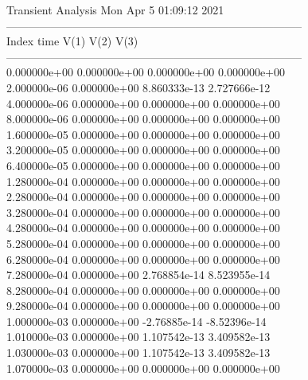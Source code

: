                                    Transient Analysis  Mon Apr  5 01:09:12  2021\\ \hline
--------------------------------------------------------------------------------\\ \hline
Index   time            V(1)            V(2)            V(3)            \\ \hline
--------------------------------------------------------------------------------\\ 	0.000000e+00	0.000000e+00	0.000000e+00	0.000000e+00	\\ 	2.000000e-06	0.000000e+00	8.860333e-13	2.727666e-12	\\ 	4.000000e-06	0.000000e+00	0.000000e+00	0.000000e+00	\\ 	8.000000e-06	0.000000e+00	0.000000e+00	0.000000e+00	\\ 	1.600000e-05	0.000000e+00	0.000000e+00	0.000000e+00	\\ 	3.200000e-05	0.000000e+00	0.000000e+00	0.000000e+00	\\ 	6.400000e-05	0.000000e+00	0.000000e+00	0.000000e+00	\\ 	1.280000e-04	0.000000e+00	0.000000e+00	0.000000e+00	\\ 	2.280000e-04	0.000000e+00	0.000000e+00	0.000000e+00	\\ 	3.280000e-04	0.000000e+00	0.000000e+00	0.000000e+00	\\ 	4.280000e-04	0.000000e+00	0.000000e+00	0.000000e+00	\\ 	5.280000e-04	0.000000e+00	0.000000e+00	0.000000e+00	\\ 	6.280000e-04	0.000000e+00	0.000000e+00	0.000000e+00	\\ 	7.280000e-04	0.000000e+00	2.768854e-14	8.523955e-14	\\ 	8.280000e-04	0.000000e+00	0.000000e+00	0.000000e+00	\\ 	9.280000e-04	0.000000e+00	0.000000e+00	0.000000e+00	\\ 	1.000000e-03	0.000000e+00	-2.76885e-14	-8.52396e-14	\\ 	1.010000e-03	0.000000e+00	1.107542e-13	3.409582e-13	\\ 	1.030000e-03	0.000000e+00	1.107542e-13	3.409582e-13	\\ 	1.070000e-03	0.000000e+00	0.000000e+00	0.000000e+00	\\ \hline

